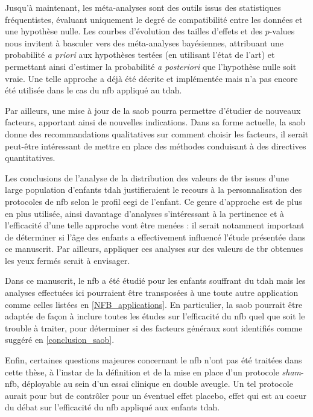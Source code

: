 Jusqu'à maintenant, les méta-analyses sont des outils issus des statistiques fréquentistes,
évaluant uniquement le degré de compatibilité entre les données et une hypothèse nulle.
Les courbes d'évolution des tailles d'effets et des $p$-values nous invitent à basculer vers des méta-analyses bayésiennes,
attribuant une probabilité \textit{a priori} aux hypothèses testées (en utilisant l'état de l'art) et permettant ainsi d'estimer 
la probabilité \textit{a posteriori} que l'hypothèse nulle soit vraie.
Une telle approche a déjà été décrite et implémentée \citep{Dormuth2016, Spiegelhalter2004} mais n'a pas encore été 
utilisée dans le cas du \gls{nfb} appliqué au \gls{tdah}.  

Par ailleurs, une mise à jour de la \gls{saob} pourra permettre d'étudier de nouveaux facteurs, apportant ainsi de nouvelles  
indications. Dans sa forme actuelle, la \gls{saob} donne des recommandations qualitatives sur comment choisir les facteurs, 
il serait peut-être intéressant de mettre en place des méthodes conduisant à des directives quantitatives.

Les conclusions de l'analyse de la distribution des valeurs de \gls{tbr} issues d'une large population d'enfants \gls{tdah} justifieraient le recours à la 
personnalisation des protocoles de \gls{nfb} selon le profil \gls{eegi} de l'enfant. Ce genre d'approche est de plus en plus utilisée, ainsi davantage 
d'analyses s'intéressant
à la pertinence et à l'efficacité d'une telle approche vont être menées : il serait notamment important de déterminer si l'âge des enfants 
a effectivement influencé l'étude
présentée dans ce manuscrit. Par ailleurs, appliquer ces analyses sur des valeurs de \gls{tbr} obtenues les yeux fermés serait à envisager. 

Dans ce manuscrit, le \gls{nfb} a été étudié pour les enfants souffrant du \gls{tdah} mais les analyses effectuées ici pourraient être 
transposées à une toute autre application comme celles listées en \ref{NFB_applications}.
En particulier, la \gls{saob} pourrait être adaptée de façon à inclure toutes les études sur l'efficacité du \gls{nfb} 
quel que soit le trouble à traiter, pour déterminer si des facteurs généraux sont identifiés comme suggéré en \ref{conclusion_saob}. 

Enfin, certaines questions majeures concernant le \gls{nfb} n'ont pas été traitées dans cette thèse,
à l'instar de la définition et de la mise en place d'un protocole \textit{sham}-\gls{nfb}, déployable au sein d'un essai clinique en double aveugle. 
Un tel protocole 
aurait pour but de contrôler pour un éventuel effet placebo, effet qui est au coeur du débat sur l'efficacité du \gls{nfb} appliqué aux enfants \gls{tdah}. 

